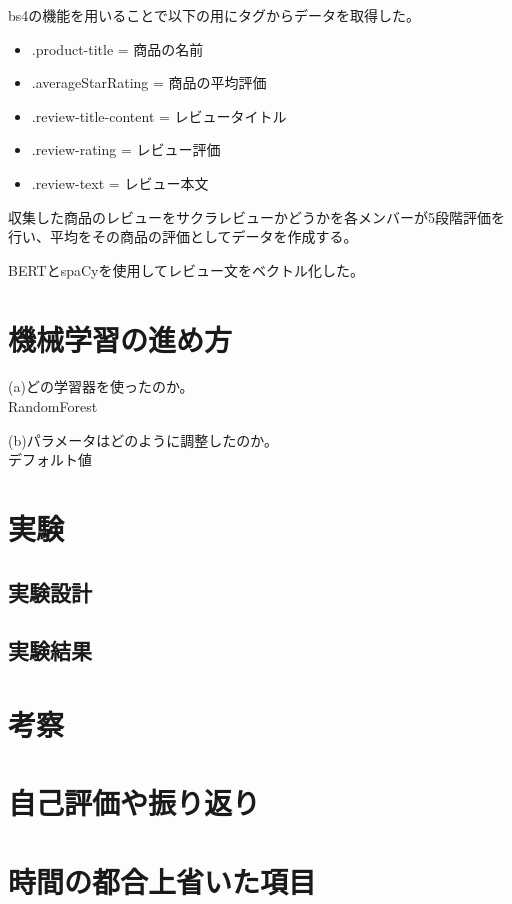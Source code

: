 \documentclass[a4paper,11pt,titlepage]{jsarticle}
\begin{document}
bs4の機能を用いることで以下の用にタグからデータを取得した。

\begin{itemize}
\item .product-title = 商品の名前
\item .averageStarRating = 商品の平均評価
\item .review-title-content = レビュータイトル
\item .review-rating = レビュー評価
\item .review-text = レビュー本文
\end{itemize}

収集した商品のレビューをサクラレビューかどうかを各メンバーが5段階評価を行い、平均をその商品の評価としてデータを作成する。

BERTとspaCyを使用してレビュー文をベクトル化した。

\section{機械学習の進め方}
(a)どの学習器を使ったのか。\\
RandomForest

(b)パラメータはどのように調整したのか。\\
デフォルト値
\section{実験}
\subsection{実験設計}

\subsection{実験結果}

\section{考察}

\section{自己評価や振り返り}

\section{時間の都合上省いた項目}
\end{document}
